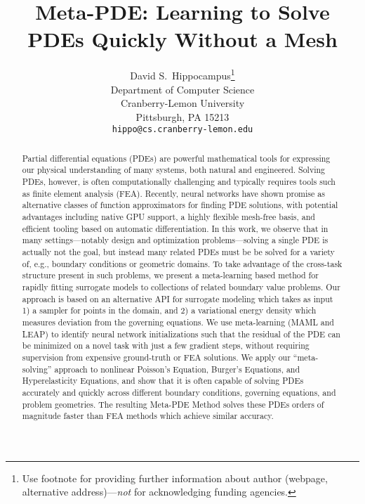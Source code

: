 \documentclass{article}
\title{Meta-PDE: Learning to Solve PDEs Quickly Without a Mesh}
\author{%
  David S.~Hippocampus\thanks{Use footnote for providing further information
    about author (webpage, alternative address)---\emph{not} for acknowledging
    funding agencies.} \\
  Department of Computer Science\\
  Cranberry-Lemon University\\
  Pittsburgh, PA 15213 \\
  \texttt{hippo@cs.cranberry-lemon.edu} \\
}
\begin{document}
\maketitle

\begin{abstract}
Partial differential equations (PDEs) are powerful mathematical tools for expressing our physical understanding of many systems, both natural and engineered.
Solving PDEs, however, is often computationally challenging and typically requires tools such as finite element analysis (FEA).
Recently, neural networks have shown promise as alternative classes of function approximators for finding PDE solutions, with potential advantages including native GPU support, a highly flexible mesh-free basis, and efficient tooling based on automatic differentiation.
In this work, we observe that in many settings---notably design and optimization problems---solving a single PDE is actually not the goal, but instead many related PDEs must be be solved for a variety of, e.g., boundary conditions or geometric domains.
To take advantage of the cross-task structure present in such problems, we present a meta-learning based method for rapidly fitting surrogate models to collections of related boundary value problems.
Our approach is based on an alternative API for surrogate modeling which takes as input 1) a sampler for points in the domain, and 2) a variational energy density which measures deviation from the governing equations.
We use meta-learning (MAML and LEAP) to identify neural network initializations such that the residual of the PDE can be minimized on a novel task with just a few gradient steps, without requiring supervision from expensive ground-truth or FEA solutions.
We apply our ``meta-solving'' approach to nonlinear Poisson's Equation, Burger's Equations, and Hyperelasticity Equations, and show that it is often capable of solving PDEs accurately and quickly across different boundary conditions, governing equations, and problem geometries.
The resulting Meta-PDE Method solves these PDEs orders of magnitude faster than FEA methods which achieve similar accuracy.
\end{abstract}

%
%
%







\newpage
\appendix

\end{document}
